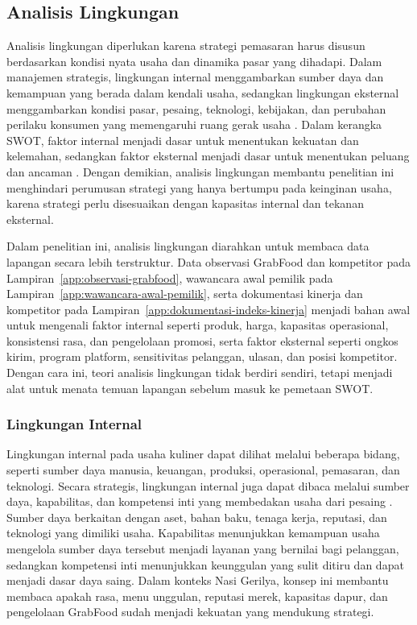 \subsection{Analisis Lingkungan}
Analisis lingkungan diperlukan karena strategi pemasaran harus disusun berdasarkan kondisi nyata usaha dan dinamika pasar yang dihadapi. Dalam manajemen strategis, lingkungan internal menggambarkan sumber daya dan kemampuan yang berada dalam kendali usaha, sedangkan lingkungan eksternal menggambarkan kondisi pasar, pesaing, teknologi, kebijakan, dan perubahan perilaku konsumen yang memengaruhi ruang gerak usaha \parencite{david2023strategicmanagement,kotler2023principlesmarketing}. Dalam kerangka SWOT, faktor internal menjadi dasar untuk menentukan kekuatan dan kelemahan, sedangkan faktor eksternal menjadi dasar untuk menentukan peluang dan ancaman \parencite{gurel2017swot,helms2010swotreview}. Dengan demikian, analisis lingkungan membantu penelitian ini menghindari perumusan strategi yang hanya bertumpu pada keinginan usaha, karena strategi perlu disesuaikan dengan kapasitas internal dan tekanan eksternal.

Dalam penelitian ini, analisis lingkungan diarahkan untuk membaca data lapangan secara lebih terstruktur. Data observasi GrabFood dan kompetitor pada Lampiran~\ref{app:observasi-grabfood}, wawancara awal pemilik pada Lampiran~\ref{app:wawancara-awal-pemilik}, serta dokumentasi kinerja dan kompetitor pada Lampiran~\ref{app:dokumentasi-indeks-kinerja} menjadi bahan awal untuk mengenali faktor internal seperti produk, harga, kapasitas operasional, konsistensi rasa, dan pengelolaan promosi, serta faktor eksternal seperti ongkos kirim, program platform, sensitivitas pelanggan, ulasan, dan posisi kompetitor. Dengan cara ini, teori analisis lingkungan tidak berdiri sendiri, tetapi menjadi alat untuk menata temuan lapangan sebelum masuk ke pemetaan SWOT.

\subsubsection{Lingkungan Internal}
Lingkungan internal pada usaha kuliner dapat dilihat melalui beberapa bidang, seperti sumber daya manusia, keuangan, produksi, operasional, pemasaran, dan teknologi. Secara strategis, lingkungan internal juga dapat dibaca melalui sumber daya, kapabilitas, dan kompetensi inti yang membedakan usaha dari pesaing \parencite{pearce2013strategicmanagement,david2023strategicmanagement}. Sumber daya berkaitan dengan aset, bahan baku, tenaga kerja, reputasi, dan teknologi yang dimiliki usaha. Kapabilitas menunjukkan kemampuan usaha mengelola sumber daya tersebut menjadi layanan yang bernilai bagi pelanggan, sedangkan kompetensi inti menunjukkan keunggulan yang sulit ditiru dan dapat menjadi dasar daya saing. Dalam konteks Nasi Gerilya, konsep ini membantu membaca apakah rasa, menu unggulan, reputasi merek, kapasitas dapur, dan pengelolaan GrabFood sudah menjadi kekuatan yang mendukung strategi.

